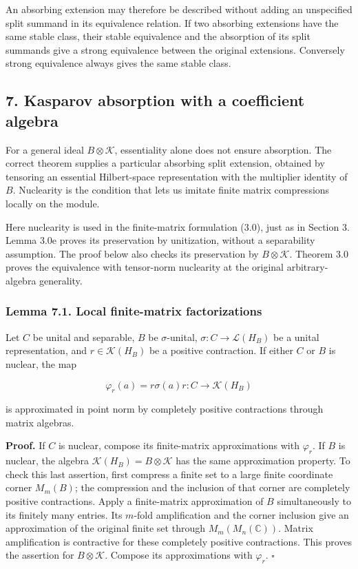 \documentclass[
  11pt,
]{article}
\begin{document}
An absorbing extension may therefore be described without adding an
unspecified split summand in its equivalence relation. If two absorbing
extensions have the same stable class, their stable equivalence and the
absorption of its split summands give a strong equivalence between the
original extensions. Conversely strong equivalence always gives the same
stable class.

\subsection{7. Kasparov absorption with a coefficient
algebra}\label{kasparov-absorption-with-a-coefficient-algebra}

For a general ideal \(B\otimes\mathcal K\), essentiality alone does not
ensure absorption. The correct theorem supplies a particular absorbing
split extension, obtained by tensoring an essential Hilbert-space
representation with the multiplier identity of \(B\). Nuclearity is the
condition that lets us imitate finite matrix compressions locally on the
module.

Here nuclearity is used in the finite-matrix formulation (3.0), just as
in Section 3. Lemma 3.0e proves its preservation by unitization, without
a separability assumption. The proof below also checks its preservation
by \(B\otimes\mathcal K\). Theorem 3.0 proves the equivalence with
tensor-norm nuclearity at the original arbitrary-algebra generality.

\subsubsection{Lemma 7.1. Local finite-matrix
factorizations}\label{lemma-7.1.-local-finite-matrix-factorizations}

Let \(C\) be unital and separable, \(B\) be \(\sigma\)-unital,
\(\sigma:C\to\mathcal L(H_B)\) be a unital representation, and
\(r\in\mathcal K(H_B)\) be a positive contraction. If either \(C\) or
\(B\) is nuclear, the map

\[
\varphi_r(a)=r\sigma(a)r:C\longrightarrow\mathcal K(H_B)
\]

is approximated in point norm by completely positive contractions
through matrix algebras.

\textbf{Proof.} If \(C\) is nuclear, compose its finite-matrix
approximations with \(\varphi_r\). If \(B\) is nuclear, the algebra
\(\mathcal K(H_B)=B\otimes\mathcal K\) has the same approximation
property. To check this last assertion, first compress a finite set to a
large finite coordinate corner \(M_m(B)\); the compression and the
inclusion of that corner are completely positive contractions. Apply a
finite-matrix approximation of \(B\) simultaneously to its finitely many
entries. Its \(m\)-fold amplification and the corner inclusion give an
approximation of the original finite set through
\(M_m(M_n(\mathbb C))\). Matrix amplification is contractive for these
completely positive contractions. This proves the assertion for
\(B\otimes\mathcal K\). Compose its approximations with \(\varphi_r\).
\(\square\)
\end{document}

